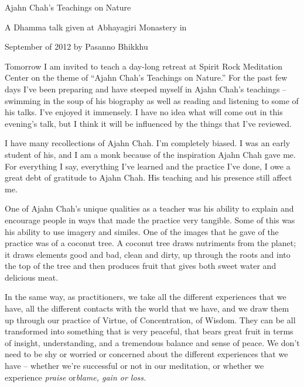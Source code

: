 \documentclass[a4paper,portrait,12pt]{article}
\begin{document}
Ajahn Chah's Teachings on Nature 


 


A Dhamma talk given at Abhayagiri Monastery in 


September of 2012 by Pasanno Bhikkhu 


 


Tomorrow I am invited to teach a day-long retreat  at  Spirit  Rock  Meditation  Center on the theme of ``Ajahn Chah's Teachings on  Nature.''  For  the  past  few  days  I've been  preparing  and  have  steeped  myself  in  Ajahn Chah's  teachings  --  swimming  in  the  soup  of  his biography  as  well  as  reading  and  listening  to  some  of  his  talks.  I've  enjoyed  it  immensely.  I  have  no idea  what  will  come  out  in  this  evening's  talk,  but  I  think  it  will  be  influenced  by  the  things  that  I've reviewed. 


I   have   many   recollections   of  Ajahn   Chah.   I'm completely biased.  I was an early student of his, and I am a monk because of the inspiration Ajahn Chah gave  me.    For  everything  I  say,  everything  I've learned  and  the  practice  I've  done,  I  owe  a  great debt of gratitude to Ajahn Chah. His teaching and his presence still affect me. 





One of Ajahn Chah's unique qualities as a teacher was  his  ability  to  explain  and  encourage  people in  ways  that  made  the  practice  very  tangible.  Some  of  this  was  his  ability  to  use  imagery  and similes.  One  of  the  images  that  he  gave  of  the practice  was  of  a  coconut  tree.  A  coconut  tree draws   nutriments   from   the   planet;   it   draws elements  good  and  bad,  clean  and  dirty,  up through the roots and into the top of the tree and then  produces  fruit  that  gives  both  sweet  water and delicious meat.  





In the same way, as practitioners, we take all the different   experiences   that   we   have,   all   the different  contacts  with  the  world  that  we  have, and  we  draw  them  up  through  our  practice  of Virtue, of Concentration, of Wisdom. They can be all transformed into something that is very peaceful, that   bears   great   fruit   in   terms   of   insight, understanding,  and  a  tremendous  balance  and sense  of  peace.  We  don't  need  to  be  shy  or worried    or   concerned    about    the    different experiences   that   we   have   --   whether   we're successful  or  not  in  our  meditation,  or  whether {\small we experience }\emph{{\small praise }}{\small or}\emph{{\small  blame, gain or loss.  }}
\end{document}
